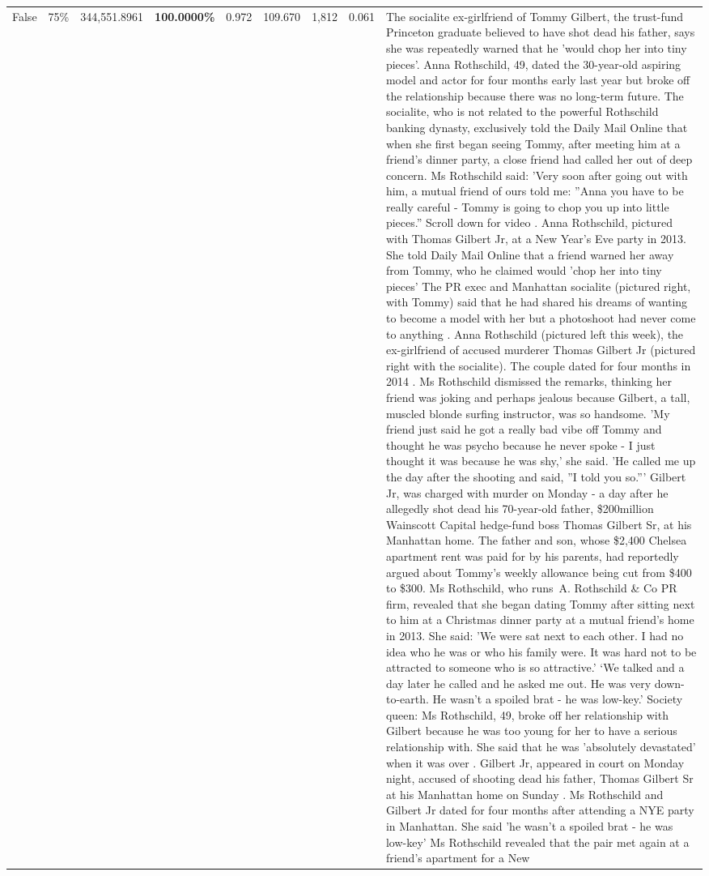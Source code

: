 \begin{table}[H]
\begin{tabular}{lllrlllll}
False & 75\% & 344,551.8961 & \bfseries \color{red} 100.0000\% & 0.972 & 109.670 & 1,812 & 0.061 & The socialite ex-girlfriend of Tommy Gilbert, the trust-fund Princeton graduate believed to have shot dead his father, says she was repeatedly warned that he 'would chop her into tiny pieces'. Anna Rothschild, 49, dated the 30-year-old aspiring model and actor for four months early last year but broke off the relationship because there was no long-term future. The socialite, who is not related to the powerful Rothschild banking dynasty, exclusively told the Daily Mail Online that when she first began seeing Tommy, after meeting him at a friend's dinner party, a close friend had called her out of deep concern. Ms Rothschild said: 'Very soon after going out with him, a mutual friend of ours told me: ''Anna you have to be really careful - Tommy is going to chop you up into little pieces.'' Scroll down for video . Anna Rothschild, pictured with Thomas Gilbert Jr, at a New Year's Eve party in 2013. She told Daily Mail Online that a friend warned her away from Tommy, who he claimed would 'chop her into tiny pieces' The PR exec and Manhattan socialite (pictured right, with Tommy) said that he had shared his dreams of wanting to become a model with her but a photoshoot had never come to anything . Anna Rothschild (pictured left this week), the ex-girlfriend of accused murderer Thomas Gilbert Jr (pictured right with the socialite). The couple dated for four months in 2014 . Ms Rothschild dismissed the remarks, thinking her friend was joking and perhaps jealous because Gilbert, a tall, muscled blonde surfing instructor, was so handsome. 'My friend just said he got a really bad vibe off Tommy and thought he was psycho because he never spoke - I just thought it was because he was shy,' she said. 'He called me up the day after the shooting and said, ''I told you so.''' Gilbert Jr, was charged with murder on Monday - a day after he allegedly shot dead his 70-year-old father, \$200million Wainscott Capital hedge-fund boss Thomas Gilbert Sr, at his Manhattan home. The father and son, whose \$2,400 Chelsea apartment rent was paid for by his parents, had reportedly argued about Tommy's weekly allowance being cut from \$400 to \$300. Ms Rothschild, who runs A. Rothschild \& Co PR firm, revealed that she began dating Tommy after sitting next to him at a Christmas dinner party at a mutual friend's home in 2013. She said: 'We were sat next to each other. I had no idea who he was or who his family were. It was hard not to be attracted to someone who is so attractive.' ‘We talked and a day later he called and he asked me out. He was very down-to-earth. He wasn’t a spoiled brat - he was low-key.’ Society queen: Ms Rothschild, 49, broke off her relationship with Gilbert because he was too young for her to have a serious relationship with. She said that he was 'absolutely devastated' when it was over . Gilbert Jr, appeared in court on Monday night, accused of shooting dead his father, Thomas Gilbert Sr at his Manhattan home on Sunday . Ms Rothschild and Gilbert Jr dated for four months after attending a NYE party in Manhattan. She said 'he wasn't a spoiled brat - he was low-key' Ms Rothschild revealed that the pair met again at a friend’s apartment for a New 
\end{tabular}
\end{table}
